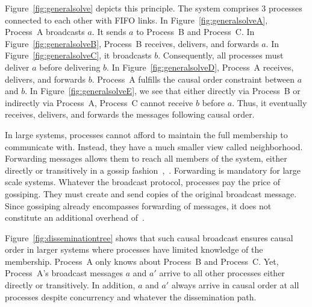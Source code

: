 Figure~\ref{fig:generalsolve} depicts this principle. The system comprises 3
processes connected to each other with FIFO links.  In
Figure~\ref{fig:generalsolveA}, Process~A broadcasts $a$. It sends $a$ to
Process~B and Process~C. In Figure~\ref{fig:generalsolveB}, Process~B receives,
delivers, and forwards $a$. In Figure~\ref{fig:generalsolveC}, it broadcasts
$b$. Consequently, all processes must deliver $a$ before delivering $b$. In
Figure~\ref{fig:generalsolveD}, Process~A receives, delivers, and forwards
$b$. Process~A fulfills the causal order constraint between $a$ and $b$. In
Figure~\ref{fig:generalsolveE}, we see that either directly via Process~B or
indirectly via Process~A, Process~C cannot receive $b$ before $a$. Thus, it
eventually receives, delivers, and forwards the messages following causal order.


In large systems, processes cannot afford to maintain the full membership to
communicate with. Instead, they have a much smaller view called
neighborhood. Forwarding messages allows them to reach all members of the
system, either directly or transitively in a gossip
fashion~\cite{demers1987epidemic},~\cite{birman1999bimodal}. Forwarding is
mandatory for large scale systems.  Whatever the broadcast protocol, processes
pay the price of gossiping. They must create and send copies of the original
broadcast message. Since gossiping already encompasses forwarding of messages,
it does not constitute an additional overhead of~\cite{friedman2004causal}.

Figure~\ref{fig:disseminationtree} shows that such causal broadcast ensures
causal order in larger systems where processes have limited knowledge of the
membership.  Process~A only knows about Process~B and Process~C.  Yet,
Process~A's broadcast messages $a$ and $a'$ arrive to all other processes either
directly or transitively. In addition, $a$ and $a'$ always arrive in causal
order at all processes despite concurrency and whatever the dissemination path.

